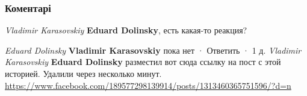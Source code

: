  
 
 
 
 
\subsubsection{Коментарі}

\begin{itemize} %
\emph{Vladimir Karasovskiy}
\textbf{Eduard Dolinsky}, есть какая-то реакция?

\begin{itemize} %
\emph{Eduard Dolinsky}
\textbf{Vladimir Karasovskiy} пока нет
 · Ответить · 1 д.
\emph{Vladimir Karasovskiy}
\textbf{Eduard Dolinsky} разместил вот сюда ссылку на пост с этой историей. Удалили через несколько минут.
\url{https://www.facebook.com/189577298139914/posts/1313460365751596/?d=n}
\end{itemize} %

\end{itemize} %

